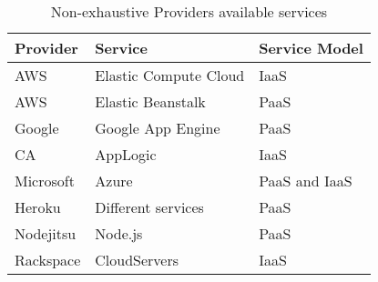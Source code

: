 \begin{table}
  \begin{center}
    \begin{tabular}{ | l | l | l | }
      \hline
      \textbf{Provider} & \textbf{Service} & \textbf{Service Model} \\ \hline
      AWS & Elastic Compute Cloud & IaaS \\ \hline
      AWS & Elastic Beanstalk & PaaS \\ \hline
      Google & Google App Engine & PaaS \\ \hline
      CA & AppLogic & IaaS \\ \hline
      Microsoft & Azure & PaaS and IaaS \\ \hline
      Heroku & Different services & PaaS \\ \hline
      Nodejitsu & Node.js & PaaS \\ \hline
      Rackspace & CloudServers & IaaS \\ \hline
    \end{tabular}
  \end{center}
  \caption{Non-exhaustive Providers available services}
  \label{table:providerservices}
\end{table}

